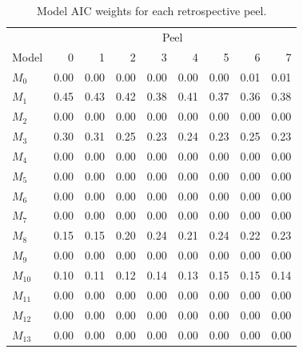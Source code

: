 \documentclass[
]{article}
\begin{document}
\begin{table}

\caption{\label{tab:aic-wts-table}Model AIC weights for each retrospective peel.}
\centering
\begin{tabular}[t]{lrrrrrrrr}
\toprule
\multicolumn{1}{c}{ } & \multicolumn{8}{c}{Peel} \\
\cmidrule(l{3pt}r{3pt}){2-9}
Model & 0 & 1 & 2 & 3 & 4 & 5 & 6 & 7\\
\midrule
$M_{0}$ & 0.00 & 0.00 & 0.00 & 0.00 & 0.00 & 0.00 & 0.01 & 0.01\\
$M_{1}$ & 0.45 & 0.43 & 0.42 & 0.38 & 0.41 & 0.37 & 0.36 & 0.38\\
$M_{2}$ & 0.00 & 0.00 & 0.00 & 0.00 & 0.00 & 0.00 & 0.00 & 0.00\\
$M_{3}$ & 0.30 & 0.31 & 0.25 & 0.23 & 0.24 & 0.23 & 0.25 & 0.23\\
$M_{4}$ & 0.00 & 0.00 & 0.00 & 0.00 & 0.00 & 0.00 & 0.00 & 0.00\\
\addlinespace
$M_{5}$ & 0.00 & 0.00 & 0.00 & 0.00 & 0.00 & 0.00 & 0.00 & 0.00\\
$M_{6}$ & 0.00 & 0.00 & 0.00 & 0.00 & 0.00 & 0.00 & 0.00 & 0.00\\
$M_{7}$ & 0.00 & 0.00 & 0.00 & 0.00 & 0.00 & 0.00 & 0.00 & 0.00\\
$M_{8}$ & 0.15 & 0.15 & 0.20 & 0.24 & 0.21 & 0.24 & 0.22 & 0.23\\
$M_{9}$ & 0.00 & 0.00 & 0.00 & 0.00 & 0.00 & 0.00 & 0.00 & 0.00\\
\addlinespace
$M_{10}$ & 0.10 & 0.11 & 0.12 & 0.14 & 0.13 & 0.15 & 0.15 & 0.14\\
$M_{11}$ & 0.00 & 0.00 & 0.00 & 0.00 & 0.00 & 0.00 & 0.00 & 0.00\\
$M_{12}$ & 0.00 & 0.00 & 0.00 & 0.00 & 0.00 & 0.00 & 0.00 & 0.00\\
$M_{13}$ & 0.00 & 0.00 & 0.00 & 0.00 & 0.00 & 0.00 & 0.00 & 0.00\\
\bottomrule
\end{tabular}
\end{table}

\setcounter{figure}{0}
\renewcommand\thefigure{S\arabic{figure}}

\pagebreak
\end{document}
